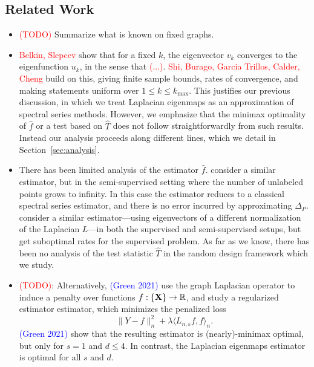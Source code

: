 \documentclass{article}
\newcommand{\Reals}{\mathbb{R}}
\newcommand{\1}{\mathbf{1}}
\newcommand{\dotp}[2]{\langle #1, #2 \rangle}
\newcommand{\wh}[1]{\widehat{#1}}
\theoremstyle{alden}
\theoremstyle{aldenthm}
\theoremstyle{definition}
\theoremstyle{remark}
\begin{document}
\subsection{Related Work}
\begin{itemize}
	\item \textcolor{red}{(TODO)} Summarize what is known on fixed graphs.
	\item \textcolor{red}{Belkin, Slepcev} show that for a fixed $k$, the eigenvector $v_k$ converges to the eigenfunction $u_k$, in the sense that \textcolor{red}{(...)}. \textcolor{red}{Shi, Burago, Garcia Trillos, Calder, Cheng} build on this, giving finite sample bounds, rates of convergence, and making statements uniform over $1 \leq k \leq k_{\max}$. This justifies our previous discussion, in which we treat Laplacian eigenmaps as an approximation of spectral series methods. However, we emphasize that the minimax optimality of $\wh{f}$ or a test based on $\wh{T}$ does not follow straightforwardly from such results. Instead our analysis proceeds along different lines, which we detail in  Section~\ref{sec:analysis}.
	\item There has been limited analysis of the estimator $\wh{f}$. \cite{zhou2011} consider a similar estimator, but in the semi-supervised setting where the number of unlabeled points grows to infinity. In this case the estimator reduces to a classical spectral series estimator, and there is no error incurred by approximating $\Delta_P$. \cite{lee2016} consider a similar estimator---using eigenvectors of a different normalization of the Laplacian $L$---in both the supervised and semi-supervised setups, but get suboptimal rates for the supervised problem. As far as we know, there has been no analysis of the test statistic $\wh{T}$ in the random design framework which we study.
	\item \textcolor{red}{(TODO)}: Alternatively, \cite{trillos2020} \textcolor{blue}{(Green 2021)} use the graph Laplacian operator to induce a penalty over functions $f: \{\bf X\} \to \Reals$, and study a regularized estimator estimator, which minimizes the penalized loss
	\begin{equation*}
	\|Y - f\|_n^2 + \lambda \dotp{L_{n,\varepsilon}f}{f}_n.
	\end{equation*}
	\textcolor{blue}{(Green 2021)} show that the resulting estimator is (nearly)-minimax optimal, but only for $s = 1$ and $d \leq 4$. In contrast, the Laplacian eigenmaps estimator is optimal for all $s$ and $d$. 
\end{itemize}
\end{document}
